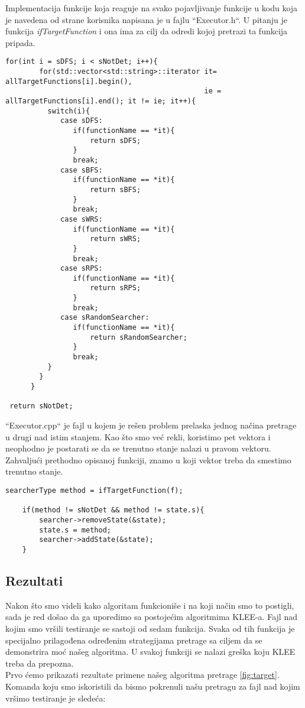 \documentclass[a4paper]{article}
\begin{document}
Implementacija funkcije koja reaguje na svako pojavljivanje funkcije u kodu koja je navedena od strane korisnika napisana je u fajlu ``Executor.h``. U pitanju je funkcija \textit{ifTargetFunction} i ona ima za cilj da odredi kojoj pretrazi ta funkcija pripada.
\begin{lstlisting}[title={Provera kojoj pretrazi funkcija treba da pripada}]
   for(int i = sDFS; i < sNotDet; i++){
        for(std::vector<std::string>::iterator it= allTargetFunctions[i].begin(), 
                                               ie = allTargetFunctions[i].end(); it != ie; it++){
          switch(i){
             case sDFS:
                if(functionName == *it){
                    return sDFS;
                }
                break;
             case sBFS:
                if(functionName == *it){
                    return sBFS;
                }
                break;
             case sWRS:
                if(functionName == *it){
                    return sWRS;
                }
                break;
             case sRPS:
                if(functionName == *it){
                    return sRPS;
                }
                break;
             case sRandomSearcher:
                if(functionName == *it){
                    return sRandomSearcher;
                }
                break;
          }
        }
      }

 return sNotDet;
\end{lstlisting}


``Executor.cpp`` je fajl u kojem je rešen problem prelaska jednog načina pretrage u drugi nad istim stanjem. Kao što smo već rekli, koristimo pet vektora i neophodno je postarati se da se trenutno stanje nalazi u pravom vektoru. Zahvaljući prethodno opisanoj funkciji, znamo u koji vektor treba da smestimo trenutno stanje.

\begin{lstlisting}[title={Prebacivanje stanja u odgovarajući vektor}]
    searcherType method = ifTargetFunction(f);
    
    if(method != sNotDet && method != state.s){
        searcher->removeState(&state);
        state.s = method;
        searcher->addState(&state);
    }
\end{lstlisting}

\subsection{Rezultati}\label{subsec:rez}
Nakon što smo videli kako algoritam funkcioniše i na koji način smo to postigli, sada je red došao da ga uporedimo sa postojećim algoritmima KLEE-a. Fajl nad kojim smo vršili testiranje se sastoji od sedam funkcija. Svaka od tih funkcija je specijalno prilagođena određenim strategijama pretrage sa ciljem da se demonstrira moć našeg algoritma. U svakoj funkciji se nalazi greška koju KLEE treba da prepozna.\\
Prvo ćemo prikazati rezultate primene našeg algoritma pretrage \ref{fig:target}. Komanda koju smo iskoristili da bismo pokrenuli našu pretragu za fajl nad kojim vršimo testiranje je sledeća:
\end{document}

